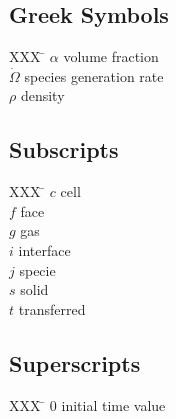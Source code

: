 \documentclass{article}
\begin{document}
\begin{multicols}{2}
      \subsection*{Greek Symbols}
        \begin{tabbing}
          XXX \= \kill
          $\alpha$ \> volume fraction \\
          $\dot{\Omega}$ \> species generation rate\\
          $\rho$ \> density
        \end{tabbing}
      \subsection*{Subscripts}
        \begin{tabbing}
          XXX \= \kill
          $c$ \> cell \\
          $f$ \> face \\
          $g$ \> gas \\
          $i$ \> interface \\
          $j$ \> specie \\
          $s$ \> solid \\
          $t$ \> transferred
        \end{tabbing}
        \subsection*{Superscripts}
        \begin{tabbing}
          XXX \= \kill
          $0$ \> initial time value
        \end{tabbing}
    \end{multicols}
\end{document}

